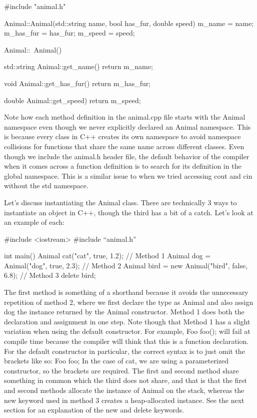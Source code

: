 \documentclass{article}
\begin{document}
\begin{cpplst}
#include "animal.h"

Animal::Animal(std::string name, bool has_fur, double speed)
{
	m_name = name;
	m_has_fur = has_fur;
	m_speed = speed;
}

Animal::~Animal()
{}

std::string Animal::get_name()
{
	return m_name;
}

void Animal::get_has_fur()
{
	return m_has_fur;
}

double Animal::get_speed)
{
	return m_speed;
}
\end{cpplst}

Note how each method definition in the animal.cpp file starts with the Animal namespace even though we never
explicitly declared an Animal namespace. This is because every class in C++ creates its own namespace to avoid
namespace collisions for functions that share the same name across different classes. Even though we include the
animal.h header file, the default behavior of the compiler when it comes across a function definition is to
search for its definition in the global namespace. This is a similar issue to when we tried accessing cout and
cin without the std namespace.

Let's discuss instantiating the Animal class. There are technically 3 ways to instantiate an object in C++,
though the third has a bit of a catch. Let's look at an example of each:

\begin{cpplst}
#include <iostream>
#include “animal.h”

int main()
{
	Animal cat("cat", true, 1.2); // Method 1
	Animal dog = Animal("dog", true, 2.3); // Method 2
	Animal bird = new Animal("bird", false, 6.8); // Method 3
	delete bird;
}
\end{cpplst}

The first method is something of a shorthand because it avoids the unnecessary repetition of method 2, where
we first declare the type as Animal and also assign dog the instance returned by the Animal constructor. Method
1 does both the declaration and assignment in one step. Note though that Method 1 has a slight variation when
using the default constructor. For example, Foo foo(); will fail at compile time because the compiler will
think that this is a function declaration. For the default constructor in particular, the correct syntax is to
just omit the brackets like so: Foo foo; In the case of cat, we are using a parameterized constructor, so the
brackets are required. The first and second method share something in common which the third does not share,
and that is that the first and second methods allocate the instance of Animal on the stack, whereas the new
keyword used in method 3 creates a heap-allocated instance. See the next section for an explanation of the new
and delete keywords.
\end{document}
